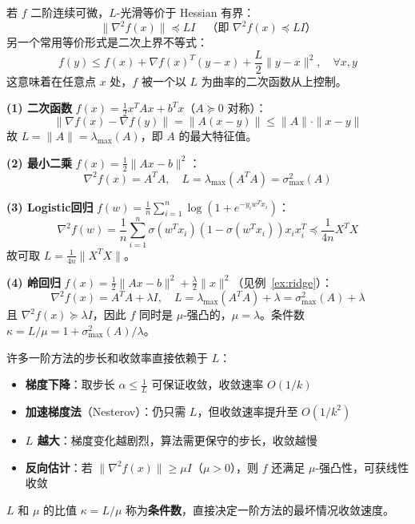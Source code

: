 \begin{notebox}[$L$-光滑的等价刻画]
若 $f$ 二阶连续可微，$L$-光滑等价于 Hessian 有界：
\[
\|\nabla^2 f(x)\| \preceq L I \quad \text{（即 } \nabla^2 f(x) \preceq L I\text{）}
\]
另一个常用等价形式是二次上界不等式：
\[
f(y) \leq f(x) + \nabla f(x)^T (y-x) + \frac{L}{2}\|y - x\|^2, \quad \forall x, y
\]
这意味着在任意点 $x$ 处，$f$ 被一个以 $L$ 为曲率的二次函数从上控制。
\end{notebox}

\begin{example}[计算Lipschitz常数]
\textbf{(1) 二次函数} $f(x) = \frac{1}{2}x^T A x + b^T x$（$A \succeq 0$ 对称）：
\[
\|\nabla f(x) - \nabla f(y)\| = \|A(x-y)\| \leq \|A\| \cdot \|x-y\|
\]
故 $L = \|A\| = \lambda_{\max}(A)$，即 $A$ 的最大特征值。

\textbf{(2) 最小二乘} $f(x) = \frac{1}{2}\|Ax - b\|^2$：
\[
\nabla^2 f(x) = A^T A, \quad L = \lambda_{\max}(A^T A) = \sigma_{\max}^2(A)
\]

\textbf{(3) Logistic回归} $f(w) = \frac{1}{n}\sum_{i=1}^n \log(1 + e^{-y_i w^T x_i})$：
\[
\nabla^2 f(w) = \frac{1}{n}\sum_{i=1}^n \sigma(w^T x_i)(1-\sigma(w^T x_i)) x_i x_i^T \preceq \frac{1}{4n} X^T X
\]
故可取 $L = \frac{1}{4n}\|X^T X\|$。

\textbf{(4) 岭回归} $f(x) = \frac{1}{2}\|Ax - b\|^2 + \frac{\lambda}{2}\|x\|^2$（见例~\ref{ex:ridge}）：
\[
\nabla^2 f(x) = A^T A + \lambda I, \quad L = \lambda_{\max}(A^T A) + \lambda = \sigma_{\max}^2(A) + \lambda
\]
且 $\nabla^2 f(x) \succeq \lambda I$，因此 $f$ 同时是 $\mu$-强凸的，$\mu = \lambda$。条件数 $\kappa = L/\mu = 1 + \sigma_{\max}^2(A)/\lambda$。
\end{example}

\begin{conceptbox}[Lipschitz常数在优化算法中的作用]
许多一阶方法的步长和收敛率直接依赖于 $L$：
\begin{itemize}
    \item \textbf{梯度下降}：取步长 $\alpha \leq \frac{1}{L}$ 可保证收敛，收敛速率 $O(1/k)$
    \item \textbf{加速梯度法}（Nesterov）：仍只需 $L$，但收敛速率提升至 $O(1/k^2)$
    \item \textbf{$L$ 越大}：梯度变化越剧烈，算法需更保守的步长，收敛越慢
    \item \textbf{反向估计}：若 $\|\nabla^2 f(x)\| \geq \mu I$（$\mu > 0$），则 $f$ 还满足 $\mu$-强凸性，可获线性收敛
\end{itemize}
$L$ 和 $\mu$ 的比值 $\kappa = L/\mu$ 称为\textbf{条件数}，直接决定一阶方法的最坏情况收敛速度。
\end{conceptbox}

